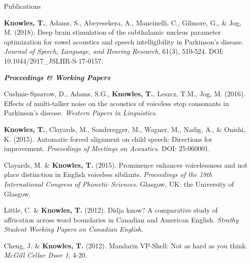 \documentclass{resume} %
\begin{document}
\begin{rSection}{Publications}
\begin{etaremune}
	\item {\bf Knowles, T.}, Adams, S., Abeyesekera, A., Mancinelli, C., Gilmore, G., \& Jog, M. (2018). Deep brain stimulation of the subthalamic nucleus parameter optimization for vowel acoustics and speech intelligibility in Parkinson's disease. \emph{Journal of Speech, Language, and Hearing Research}, 61(3), 510-524. DOI: 10.1044/2017\_JSLHR-S-17-0157.

\end{etaremune}

\begin{center}
	{\bf \emph{Proceedings \& Working Papers}}
\end{center}

\begin{etaremune}

	\item Cushnie-Sparrow, D., Adams, S.G., {\bf Knowles, T.}, Leszcz, T.M., Jog, M. (2016). Effects of multi-talker noise on the acoustics of voiceless stop consonants in Parkinson's disease. \emph{Western Papers in Linguistics.}

	\item {\bf Knowles, T.}, Clayards, M., Sonderegger, M., Wagner, M., Nadig, A., \& Onishi, K. (2015). Automatic forced alignment on child speech: Directions for improvement. \emph{Proceedings of Meetings on Acoustics.} DOI: 25:060001.

	\item Clayards, M. \& {\bf Knowles, T.} (2015). Prominence enhances voicelessness and not place distinction in English voiceless sibilants. \emph{Proceedings of the 18th International Congress of Phonetic Sciences.} Glasgow, UK: the University of Glasgow.

	\item Little, C. \& {\bf Knowles, T.} (2012). Didja know? A comparative study of affrication across word boundaries in Canadian and American English. \emph{Strathy Student Working Papers on Canadian English.}

	\item Cheng, J. \& {\bf Knowles, T.} (2012). Mandarin VP-Shell: Not as hard as you think. \emph{McGill Cellar Door 1}, 4-20.

\end{etaremune}

\end{rSection}
\end{document}
